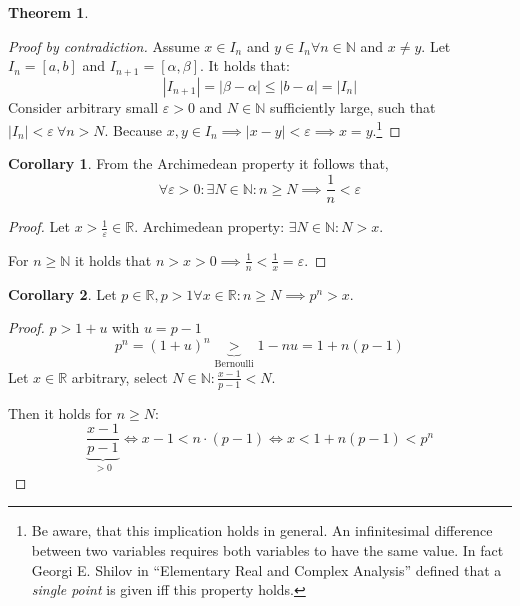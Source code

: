 \documentclass[a4paper,landscape,twocolumn]{article}
\theoremstyle{definition}
\newtheorem{theorem}{Theorem}
\newtheorem{cor}{Corollary}
\newcommand\abs[1]{\left|#1\right|}
\begin{document}
\begin{theorem}
\begin{description}
      \begin{proof}[Proof by contradiction]
        Assume $x \in I_n$ and $y \in I_n \forall n \in \mathbb N$ and $x \neq y$.
        Let $I_n = [a,b]$ and $I_{n+1} = [\alpha, \beta]$. It holds that:
        \[ \abs{I_{n+1}} = \abs{\beta - \alpha} \leq \abs{b - a} = \abs{I_n} \]
        Consider arbitrary small $\varepsilon > 0$ and $N \in \mathbb N$ sufficiently large,
        such that $\abs{I_n} < \varepsilon \:\forall n > N$. Because $x,y \in I_n \implies
        \abs{x - y} < \varepsilon \implies x = y$.\footnote{
          Be aware, that this implication holds in general.
          An infinitesimal difference between two variables requires both variables
          to have the same value. In fact Georgi E. Shilov in \enquote{Elementary Real and Complex Analysis}
          defined that a \emph{single point} is given iff this property holds.
        }%
      \end{proof}
  \end{description}
\end{theorem}

\begin{cor}
  From the Archimedean property it follows that,
  \[ \forall \varepsilon > 0: \exists N \in \mathbb N: n \geq N \implies \frac1n < \varepsilon \]
\end{cor}

\begin{proof}
  Let $x > \frac1\varepsilon \in \mathbb R$.
  Archimedean property: $\exists N \in \mathbb N: N > x$.

  For $n \geq \mathbb N$ it holds that $n > x > 0 \implies \frac1n < \frac1x = \varepsilon$.
\end{proof}

\begin{cor}
  Let $p \in \mathbb R, p > 1 \forall x \in \mathbb R: n \geq N \implies p^n > x$.
\end{cor}

\begin{proof}
  $p > 1 + u$ with $u = p - 1$
  \[ p^n = (1 + u)^n \underbrace{>}_{\text{Bernoulli}} 1 - nu = 1 + n(p-1) \]
  Let $x \in \mathbb R$ arbitrary, select $N \in \mathbb N: \frac{x-1}{p-1} < N$.

  Then it holds for $n \geq N:$
  \[
    \frac{x-1}{\underbrace{p-1}_{>0}}
    \Leftrightarrow x - 1 < n\cdot(p-1)
    \Leftrightarrow x < 1 + n(p-1) < p^n
  \]
\end{proof}
\end{document}
